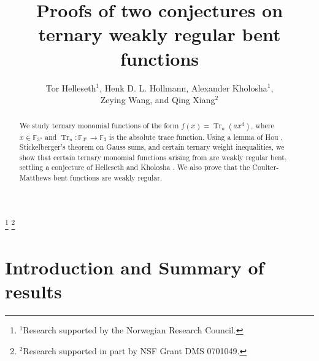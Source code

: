 \documentclass[11pt, reqno]{amsart}
\newcommand{\Ff}{{\mathbb F}}
\def\Tr{\operatorname{Tr}}
\def\Tr{\operatorname{Tr}}
\begin{document}
\title{Proofs of two conjectures on ternary weakly regular bent functions}

\author[Helleseth, Hollmann, Kholosha, Wang, and Xiang]
{Tor Helleseth$^1$, Henk D. L. Hollmann, Alexander Kholosha$^1$,\\
Zeying Wang, and Qing Xiang$^2$}
\thanks{$^1$Research supported by the Norwegian Research Council.}
\thanks{$^2$Research supported in part by NSF Grant DMS 0701049.}




\date{}


\begin{abstract}
We study ternary monomial functions of the form $f(x)=\Tr_n(ax^d)$,
where $x\in \Ff_{3^n}$ and $\Tr_n: \Ff_{3^n}\rightarrow \Ff_3$ is
the absolute trace function. Using a lemma of Hou \cite{hou},
Stickelberger's theorem on Gauss sums, and certain ternary weight
inequalities, we show that certain ternary monomial functions
arising from \cite{hk1} are weakly regular bent, settling a
conjecture of Helleseth and Kholosha \cite{hk1}. We also prove that
the Coulter-Matthews bent functions are weakly regular.
\end{abstract}

\maketitle

\section{Introduction and Summary of results}\label{intro}
\end{document}
